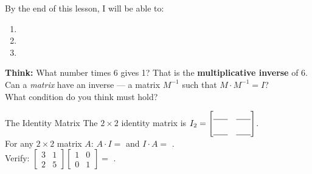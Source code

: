 \documentclass[10pt]{article}
\begin{document}
\namedateperiod

\vspace{0.1in}

\begin{objectivebox}
By the end of this lesson, I will be able to:
\begin{enumerate}[leftmargin=1.5em, itemsep=4pt]
    \item \writeline
    \item \writeline
    \item \writeline
\end{enumerate}
\end{objectivebox}

\vspace{0.08in}

\begin{vocabbox}
\end{vocabbox}

\vspace{0.08in}

\begin{hookbox}
\textbf{Think:} What number times 6 gives 1? \blank{3cm}
That is the \textbf{multiplicative inverse} of 6.\\[6pt]
Can a \emph{matrix} have an inverse --- a matrix $M^{-1}$ such that
$M \cdot M^{-1} = I$?\\[6pt]
What condition do you think must hold? \writeline
\end{hookbox}

\vspace{0.08in}

\begin{notesbox}{The Identity Matrix}
The $2\times2$ identity matrix is $I_2 = \begin{bmatrix}\blank{0.6cm} & \blank{0.6cm} \\[6pt]
\blank{0.6cm} & \blank{0.6cm}\end{bmatrix}$.\\[8pt]

For any $2\times2$ matrix $A$: \quad $A \cdot I = $ \blank{2cm} \quad and \quad $I \cdot A = $ \blank{2cm}.\\[8pt]

Verify: $\begin{bmatrix}3&1\\2&5\end{bmatrix}\begin{bmatrix}1&0\\0&1\end{bmatrix} = $ \blank{4cm}.
\end{notesbox}
\end{document}
